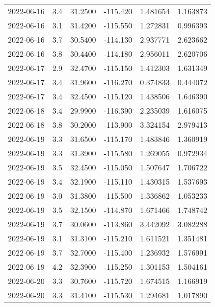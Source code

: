 \begin{tabular}{lrrrrr}
2022-06-16 &       3.4 &  31.2500 &  -115.420 &         1.481654 &         1.163873 \\
2022-06-16 &       3.1 &  31.4200 &  -115.550 &         1.272831 &         0.996393 \\
2022-06-16 &       3.7 &  30.5400 &  -114.130 &         2.937771 &         2.623662 \\
2022-06-16 &       3.8 &  30.4400 &  -114.180 &         2.956011 &         2.620706 \\
2022-06-17 &       2.9 &  32.4700 &  -115.150 &         1.412303 &         1.631349 \\
2022-06-17 &       3.4 &  31.9600 &  -116.270 &         0.374833 &         0.444072 \\
2022-06-17 &       3.4 &  32.4500 &  -115.120 &         1.438506 &         1.646390 \\
2022-06-18 &       3.4 &  29.9900 &  -116.390 &         2.235039 &         1.616075 \\
2022-06-18 &       3.8 &  30.2000 &  -113.900 &         3.324154 &         2.979413 \\
2022-06-19 &       3.3 &  31.6500 &  -115.170 &         1.483846 &         1.360919 \\
2022-06-19 &       3.3 &  31.3900 &  -115.580 &         1.269055 &         0.972934 \\
2022-06-19 &       3.5 &  32.4500 &  -115.050 &         1.507647 &         1.706722 \\
2022-06-19 &       3.4 &  32.1900 &  -115.110 &         1.430315 &         1.537693 \\
2022-06-19 &       3.0 &  31.3800 &  -115.500 &         1.336862 &         1.053233 \\
2022-06-19 &       3.5 &  32.1500 &  -114.870 &         1.671466 &         1.748742 \\
2022-06-19 &       3.7 &  30.0600 &  -113.860 &         3.442092 &         3.082288 \\
2022-06-19 &       3.1 &  31.3100 &  -115.210 &         1.611521 &         1.351481 \\
2022-06-19 &       3.7 &  32.7000 &  -115.400 &         1.236932 &         1.576991 \\
2022-06-19 &       4.2 &  32.3900 &  -115.250 &         1.301153 &         1.504161 \\
2022-06-20 &       3.3 &  30.7600 &  -115.720 &         1.674515 &         1.166919 \\
2022-06-20 &       3.3 &  31.4100 &  -115.530 &         1.294681 &         1.017890 \\

\end{tabular}
